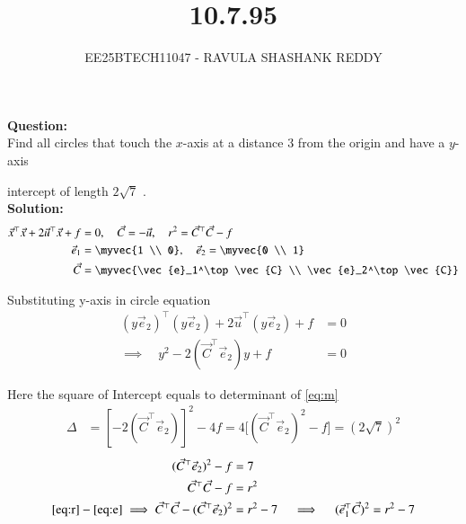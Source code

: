 \documentclass[journal]{article}
\begin{document}
	
	
	\vspace{3cm}
	
\title{10.7.95}
\author{EE25BTECH11047 - RAVULA SHASHANK REDDY}
\maketitle
\hrulefill
\bigskip 

\renewcommand{\thetable}{\theenumi}
\setlength{\intextsep}{10pt}

\textbf{Question:} \\

 Find all circles that touch the $x$-axis at a distance $3$ from the origin and have a $y$-axis 
 
 intercept of length $2\sqrt{7}$ .\\
 
\textbf{Solution:}
\begin{align}
\vec{x}^\top \vec{x} + 2 \vec{u}^\top \vec{x} + f &= 0, \quad \vec{C} = -\vec{u}, \quad r^2 = \vec{C}^\top \vec{C} - f \\
\vec{e}_1 &= \myvec{1 \\ 0}, \quad \vec{e}_2 = \myvec{0 \\ 1}\\
\quad \vec{C}&=\myvec{\vec{e}_1^\top \vec{C} \\ \vec{e}_2^\top \vec{C}}
\end{align}

Substituting y-axis in circle equation
\begin{align}
(y \vec{e}_2)^\top (y \vec{e}_2) + 2 \vec{u}^\top (y \vec{e}_2) + f &= 0 
\\ \implies \quad 
y^2 - 2 (\vec{C}^\top \vec{e}_2) y + f &= 0 \label{eq:m}
\end{align}

Here the square of Intercept equals to determinant of \eqref{eq:m}
\begin{align}
\Delta &= [-2 (\vec{C}^\top \vec{e}_2)]^2 - 4 f = 4 \big[ (\vec{C}^\top \vec{e}_2)^2 - f \big]=(2\sqrt{7})^2
\end{align}
\begin{align}
(\vec{C}^\top \vec{e}_2)^2 - f &= 7 \label{eq:e}\\
\vec{C}^\top \vec{C} - f&=r^2 \label{eq:r}\\
\eqref{eq:r}-\eqref{eq:e}\implies\vec{C}^\top \vec{C} - (\vec{C}^\top \vec{e}_2)^2 &= r^2 - 7 
\quad \implies \quad (\vec{e}_1^\top \vec{C})^2 = r^2 - 7 
\end{align}
\end{document}

